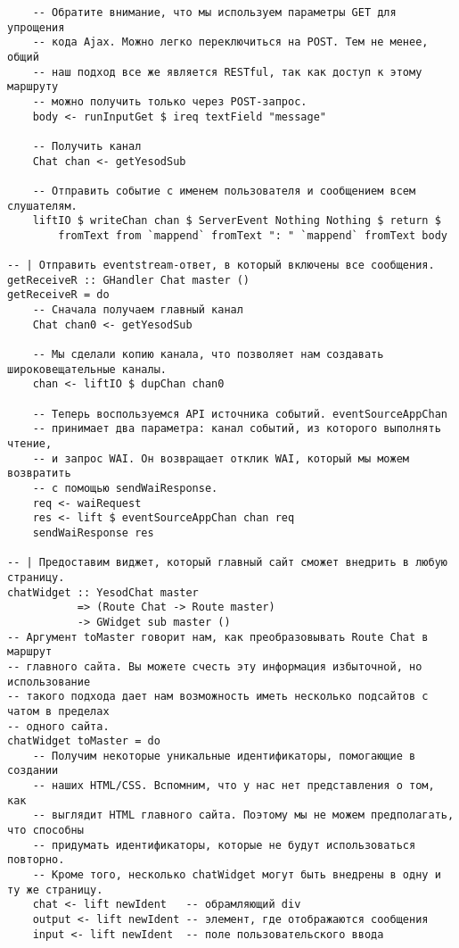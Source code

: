 \begin{lstlisting}
    -- Обратите внимание, что мы используем параметры GET для упрощения
    -- кода Ajax. Можно легко переключиться на POST. Тем не менее, общий 
    -- наш подход все же является RESTful, так как доступ к этому маршруту
    -- можно получить только через POST-запрос.
    body <- runInputGet $ ireq textField "message"

    -- Получить канал
    Chat chan <- getYesodSub

    -- Отправить событие с именем пользователя и сообщением всем слушателям.
    liftIO $ writeChan chan $ ServerEvent Nothing Nothing $ return $
        fromText from `mappend` fromText ": " `mappend` fromText body

-- | Отправить eventstream-ответ, в который включены все сообщения.
getReceiveR :: GHandler Chat master ()
getReceiveR = do
    -- Сначала получаем главный канал
    Chat chan0 <- getYesodSub

    -- Мы сделали копию канала, что позволяет нам создавать широковещательные каналы.
    chan <- liftIO $ dupChan chan0

    -- Теперь воспользуемся API источника событий. eventSourceAppChan
    -- принимает два параметра: канал событий, из которого выполнять чтение,
    -- и запрос WAI. Он возвращает отклик WAI, который мы можем возвратить
    -- с помощью sendWaiResponse.
    req <- waiRequest
    res <- lift $ eventSourceAppChan chan req
    sendWaiResponse res

-- | Предоставим виджет, который главный сайт сможет внедрить в любую страницу.
chatWidget :: YesodChat master
           => (Route Chat -> Route master)
           -> GWidget sub master ()
-- Аргумент toMaster говорит нам, как преобразовывать Route Chat в маршрут
-- главного сайта. Вы можете счесть эту информация избыточной, но использование
-- такого подхода дает нам возможность иметь несколько подсайтов с чатом в пределах
-- одного сайта.
chatWidget toMaster = do
    -- Получим некоторые уникальные идентификаторы, помогающие в создании
    -- наших HTML/CSS. Вспомним, что у нас нет представления о том, как
    -- выглядит HTML главного сайта. Поэтому мы не можем предполагать, что способны
    -- придумать идентификаторы, которые не будут использоваться повторно.
    -- Кроме того, несколько chatWidget могут быть внедрены в одну и ту же страницу.
    chat <- lift newIdent   -- обрамляющий div
    output <- lift newIdent -- элемент, где отображаются сообщения
    input <- lift newIdent  -- поле пользовательского ввода


\end{lstlisting}
